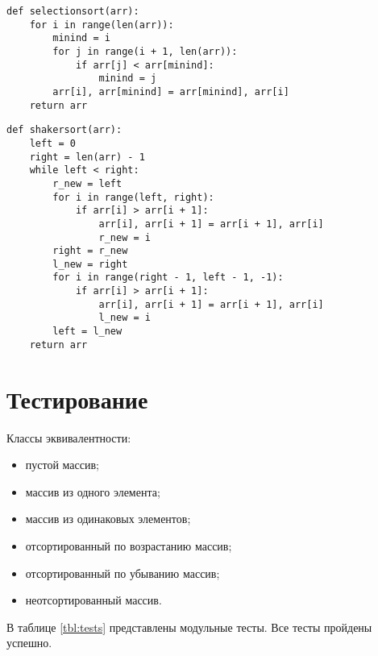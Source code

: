 \begin{center}
    \captionsetup{justification=raggedright,singlelinecheck=off}
    \begin{lstlisting}[label=lst:selectionsort,caption=Сортировка выбором]
def selectionsort(arr):
    for i in range(len(arr)):
        minind = i
        for j in range(i + 1, len(arr)):
            if arr[j] < arr[minind]:
                minind = j
        arr[i], arr[minind] = arr[minind], arr[i]
    return arr
\end{lstlisting}
\end{center}


\begin{center}
    \captionsetup{justification=raggedright,singlelinecheck=off}
    \begin{lstlisting}[label=lst:shakersort,caption=Сортировка перемешиванием (шейкерная)]
def shakersort(arr):
    left = 0
    right = len(arr) - 1
    while left < right:
        r_new = left
        for i in range(left, right):
            if arr[i] > arr[i + 1]:
                arr[i], arr[i + 1] = arr[i + 1], arr[i]
                r_new = i
        right = r_new
        l_new = right
        for i in range(right - 1, left - 1, -1):
            if arr[i] > arr[i + 1]:
                arr[i], arr[i + 1] = arr[i + 1], arr[i]
                l_new = i
        left = l_new
    return arr
\end{lstlisting}
\end{center}


\section{Тестирование}
Классы эквивалентности:

\begin{itemize}[label=---]
    \item пустой массив;
    \item массив из одного элемента;
    \item массив из одинаковых элементов;
    \item отсортированный по возрастанию массив;
    \item отсортированный по убыванию массив;
    \item неотсортированный массив.
\end{itemize}

В таблице \ref{tbl:tests} представлены модульные тесты. Все тесты пройдены успешно.

